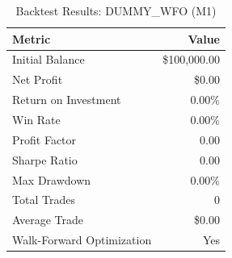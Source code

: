 \begin{table}[htbp]
\centering
\caption{Backtest Results: DUMMY_WFO (M1)}
\label{tab:backtest_dummy_wfo}
\begin{tabular}{l | r}
\hline
\hline
\textbf{Metric} & \textbf{Value} \\
\hline
Initial Balance & \$100,000.00 \\
Net Profit & \$0.00 \\
Return on Investment & 0.00\% \\
Win Rate & 0.00\% \\
Profit Factor & 0.00 \\
Sharpe Ratio & 0.00 \\
Max Drawdown & 0.00\% \\
Total Trades & 0 \\
Average Trade & \$0.00 \\
Walk-Forward Optimization & Yes  \\
\hline
\hline
\end{tabular}
\vspace{1ex}
\end{table}
